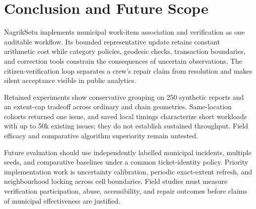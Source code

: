 \documentclass[conference,a4paper]{IEEEtran}
\begin{document}
\section{Conclusion and Future Scope}
NagrikSetu implements municipal work-item association and verification as one auditable workflow. Its bounded representative update retains constant arithmetic cost while category policies, geodesic checks, transaction boundaries, and correction tools constrain the consequences of uncertain observations. The citizen-verification loop separates a crew's repair claim from resolution and makes silent acceptance visible in public analytics.

Retained experiments show conservative grouping on 250 synthetic reports and an extent-cap tradeoff across ordinary and chain geometries. Same-location cohorts returned one issue, and saved local timings characterize short workloads with up to 50k existing issues; they do not establish sustained throughput. Field efficacy and comparative algorithm superiority remain untested.

Future evaluation should use independently labelled municipal incidents, multiple seeds, and comparative baselines under a common ticket-identity policy. Priority implementation work is uncertainty calibration, periodic exact-extent refresh, and neighbourhood locking across cell boundaries. Field studies must measure verification participation, abuse, accessibility, and repair outcomes before claims of municipal effectiveness are justified.



\end{document}
